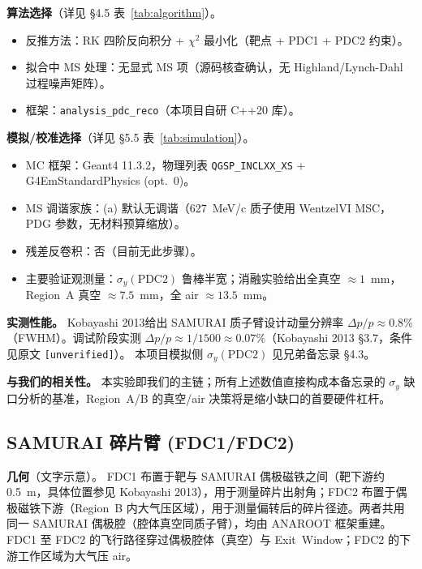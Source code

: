 \documentclass[a4paper, 11pt]{article}
\begin{document}
\textbf{算法选择}（详见 §4.5 表~\ref{tab:algorithm}）。
\begin{itemize}[leftmargin=2em,itemsep=0pt]
\item 反推方法：RK 四阶反向积分 + $\chi^2$ 最小化（靶点 + PDC1 + PDC2 约束）。
\item 拟合中 MS 处理：无显式 MS 项（源码核查确认，无 Highland/Lynch-Dahl 过程噪声矩阵）。
\item 框架：\texttt{analysis\_pdc\_reco}（本项目自研 C++20 库）。
\end{itemize}

\textbf{模拟/校准选择}（详见 §5.5 表~\ref{tab:simulation}）。
\begin{itemize}[leftmargin=2em,itemsep=0pt]
\item MC 框架：Geant4 11.3.2，物理列表 \texttt{QGSP\_INCLXX\_XS} + G4EmStandardPhysics (opt.~0)。
\item MS 调谐家族：(a) 默认无调谐（627~MeV/c 质子使用 WentzelVI MSC，PDG 参数，无材料预算缩放）。
\item 残差反卷积：否（目前无此步骤）。
\item 主要验证观测量：$\sigma_y(\text{PDC2})$ 鲁棒半宽；消融实验给出全真空 $\approx 1$~mm，Region~A 真空 $\approx 7.5$~mm，全 air $\approx 13.5$~mm。
\end{itemize}

\textbf{实测性能。}
Kobayashi 2013给出 SAMURAI 质子臂设计动量分辨率 $\Delta p/p \approx 0.8\%$（FWHM）。调试阶段实测 $\Delta p / p \approx 1/1500 \approx 0.07\%$（Kobayashi 2013 §3.7，条件见原文 \texttt{[unverified]}）。
本项目模拟侧 $\sigma_y(\text{PDC2})$ 见兄弟备忘录 §4.3。

\textbf{与我们的相关性。}
本实验即我们的主链；所有上述数值直接构成本备忘录的 $\sigma_y$ 缺口分析的基准，Region~A/B 的真空/air 决策将是缩小缺口的首要硬件杠杆。

\subsection{SAMURAI 碎片臂 (FDC1/FDC2)}
\label{sec:card_samurai_fragment}

\textbf{几何}（文字示意）。
FDC1 布置于靶与 SAMURAI 偶极磁铁之间（靶下游约 0.5~m，具体位置参见 Kobayashi 2013），用于测量碎片出射角；FDC2 布置于偶极磁铁下游（Region~B 内大气压区域），用于测量偏转后的碎片径迹。两者共用同一 SAMURAI 偶极腔（腔体真空同质子臂），均由 ANAROOT 框架重建。FDC1 至 FDC2 的飞行路径穿过偶极腔体（真空）与 Exit~Window；FDC2 的下游工作区域为大气压 air。
\end{document}
